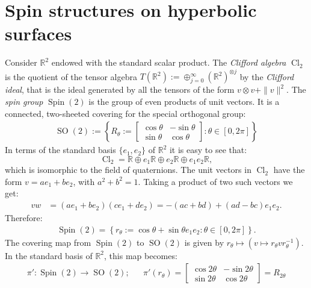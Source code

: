 \documentclass[12pt]{amsart}
\theoremstyle{definition}
\def\RR{{\mathbb R}}
\newcommand{\cl}{\operatorname{Cl}}
\newcommand{\so}{\operatorname{SO}}
\newcommand{\spin}{\operatorname{Spin}}
\begin{document}
\section{Spin structures on hyperbolic surfaces} 
Consider $\RR^2$ endowed with the standard scalar product. The \emph{Clifford algebra} $\cl_2$ is the quotient of the tensor algebra $T(\RR^2):=\oplus_{j=0}^{\infty} (\RR^2)^{\otimes j}$ by the \emph{Clifford ideal}, that is the ideal generated by all the tensors of the form $v\otimes v + \|v \|^2$. The \emph{spin group} $\spin(2)$ is the group of even products of unit vectors. It is a connected, two-sheeted covering for the special orthogonal group: 
\begin{align*}
\so(2):=\left\lbrace R_{\theta}:= \begin{bmatrix}
\cos \theta & -\sin \theta\\
\sin \theta & \cos \theta
\end{bmatrix}
:\theta\in [0,2\pi] \right\rbrace
\end{align*}
In terms of the standard basis $\{e_1,e_2 \}$ of $\RR^2$ it is easy to see that:
\[
\cl_2 = \RR \oplus e_1\RR \oplus e_2\RR \oplus e_1e_2\RR,
\]
which is isomorphic to the field of quaternions. The unit vectors in $\cl_2$ have the form $v=ae_1+be_2$, with $a^2+b^2=1$. Taking a product of two such vectors we get:
\begin{align*}
vw
&=
(ae_1+be_2)(ce_1+de_2)
=-(ac+bd) + (ad-bc)e_1e_2.
\end{align*}
Therefore:
\begin{align*}
\spin(2) = \left\lbrace r_{\theta}:= \cos \theta + \sin \theta e_1 e_2 : \theta \in [0,2\pi]  \right\rbrace.
\end{align*}
The covering map from $\spin(2)$ to $\so(2)$ is given by $r_{\theta} \mapsto \left( v \mapsto r_{\theta}vr_{\theta}^{-1} \right)$. In the standard basis of $\RR^2$, this map becomes:
\begin{align*}
\pi':\spin(2) \longrightarrow \so(2);
&&
\pi'(r_{\theta})=
\begin{bmatrix}
\cos 2\theta & -\sin 2\theta\\
\sin 2\theta & \cos 2\theta 
\end{bmatrix}
= R_{2\theta}
\end{align*}
\end{document}
